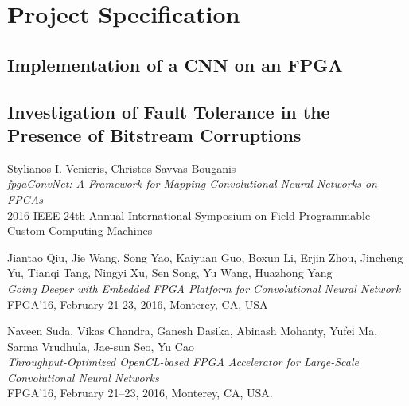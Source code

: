 \documentclass[11pt]{article}
\begin{document}
\section{Project Specification}
\label{sec:ProjectSpecification}

\subsection{Implementation of a CNN on an FPGA}
\label{sec:ImplementationOfACNNOnAnFPGA}



\subsection{Investigation of Fault Tolerance in the Presence of Bitstream Corruptions}
\label{sec:InvestigationOfFaultToleranceInThePresenceOfBitstreamCorruptions}







\begin{thebibliography}{9}

Stylianos I. Venieris, Christos-Savvas Bouganis\\
\textit{fpgaConvNet: A Framework for Mapping Convolutional Neural Networks on FPGAs}\\
2016 IEEE 24th Annual International Symposium on Field-Programmable Custom Computing Machines

Jiantao Qiu, Jie Wang, Song Yao, Kaiyuan Guo, Boxun Li, Erjin Zhou, Jincheng Yu, Tianqi Tang, Ningyi Xu, Sen Song, Yu Wang, Huazhong Yang\\
\textit{Going Deeper with Embedded FPGA Platform for Convolutional Neural Network}\\
FPGA’16, February 21-23, 2016, Monterey, CA, USA

Naveen Suda, Vikas Chandra, Ganesh Dasika, Abinash Mohanty, Yufei Ma, Sarma Vrudhula, Jae-sun Seo, Yu Cao\\
\textit{Throughput-Optimized OpenCL-based FPGA Accelerator for Large-Scale Convolutional Neural Networks}\\
FPGA’16, February 21–23, 2016, Monterey, CA, USA.

\end{thebibliography}
\end{document}
